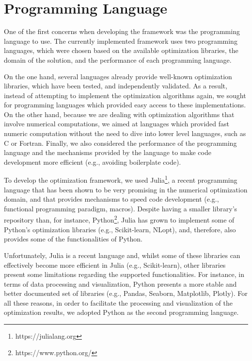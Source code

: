 \section{Programming Language}
One of the first concerns when developing the framework was the programming language to use. The currently implemented framework uses two programming languages, which were chosen based on the available optimization libraries, the domain of the solution, and the performance of each programming language.
 
On the one hand, several languages already provide well-known optimization libraries, which have been tested, and independently validated. As a result, instead of attempting to implement the optimization algorithms again, we sought for programming languages which provided easy access to these implementations. On the other hand, because we are dealing with optimization algorithms that involve numerical computations, we aimed at languages which provided fast numeric computation without the need to dive into lower level languages, such as C or Fortran. Finally, we also considered the performance of the programming language and the mechanisms provided by the language to make code development more efficient (e.g., avoiding boilerplate code).

To develop the optimization framework, we used Julia\footnote{https://julialang.org}, a recent programming language that has been shown to be very promising in the numerical optimization domain, and that provides mechanisms to speed code development (e.g., functional programming paradigm, macros). Despite having a smaller library's repository than, for instance, Python\footnote{https://www.python.org/}, Julia has grown to implement some of Python's optimization libraries (e.g., Scikit-learn, NLopt), and, therefore, also provides some of the functionalities of Python.   

Unfortunately, Julia is a recent language and, whilst some of these libraries can effectively become more efficient in Julia (e.g., Scikit-learn), other libraries present some limitations regarding the supported functionalities. For instance, in terms of data processing and visualization, Python presents a more stable  and better documented set of libraries (e.g., Pandas, Seaborn, Matplotlib, Plotly). For all these reasons, in order to facilitate the processing and visualization of the optimization results, we adopted Python as the second programming language.

